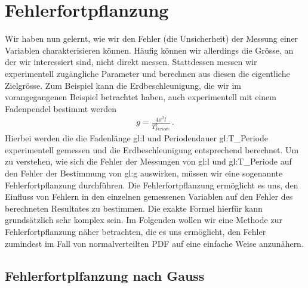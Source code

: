 \section{Fehlerfortpflanzung}
\label{chap:fehler:sec:fehlerfortpflanzung}

Wir haben nun gelernt, wie wir den Fehler (die Unsicherheit) der Messung einer Variablen charakterisieren können. Häufig können wir allerdings die Grösse, an der wir interessiert sind, nicht direkt messen. Stattdessen messen wir experimentell zugängliche Parameter und berechnen aus diesen die eigentliche Zielgrösse. Zum Beispiel kann die Erdbeschleunigung, die wir im vorangegangenen Beispiel betrachtet haben, auch experimentell mit einem Fadenpendel bestimmt werden
\begin{align}
g = \frac{4 \pi^2 l}{T_{Periode}^2}\,.
\label{eq:vl2-2}
\end{align}
Hierbei werden die die Fadenl\"ange \gls{gl:l} und Periodendauer \gls{gl:T_Periode} experimentell gemessen und die Erdbeschleunigung entsprechend berechnet.  Um zu verstehen, wie sich die Fehler der Messungen von \gls{gl:l}  und \gls{gl:T_Periode} auf den Fehler der Bestimmung von \gls{gl:g} auswirken, müssen wir eine sogenannte Fehlerfortpflanzung durchführen. Die Fehlerfortpflanzung ermöglicht es uns, den Einfluss von Fehlern in den einzelnen gemessenen Variablen auf den Fehler des berechneten Resultates zu bestimmen. Die exakte Formel hierfür kann grundsätzlich sehr komplex sein. Im Folgenden wollen wir eine Methode zur Fehlerfortpflanzung näher betrachten, die es uns ermöglicht, den Fehler zumindest im Fall von normalverteilten PDF auf eine einfache Weise anzunähern. 


\subsection{Fehlerfortplfanzung nach Gauss}

